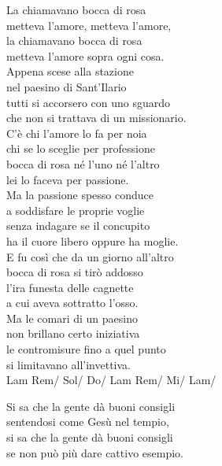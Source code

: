 \documentclass[10pt, twoside, a4paper]{article}
\begin{document}
\begin{multicols}{2}

La chiamavano bocca di rosa \\
metteva l'amore, metteva l'amore, \\
la chiamavano bocca di rosa \\
metteva l'amore sopra ogni cosa. \\

Appena scese alla stazione \\
nel paesino di Sant'Ilario \\
tutti si accorsero con uno sguardo \\
che non si trattava di un missionario. \\

C'\`e chi l'amore lo fa per noia \\
chi se lo sceglie per professione \\
bocca di rosa n\'e l'uno n\'e l'altro \\
lei lo faceva per passione. \\

Ma la passione spesso conduce \\
a soddisfare le proprie voglie \\
senza indagare se il concupito \\
ha il cuore libero oppure ha moglie. \\

E fu cos\`i che da un giorno all'altro \\
bocca di rosa si tir\`o addosso \\
l'ira funesta delle cagnette \\
a cui aveva sottratto l'osso. \\

Ma le comari di un paesino \\
non brillano certo iniziativa \\
le contromisure fino a quel punto \\
si limitavano all'invettiva. \\

Lam Rem/ Sol/ Do/ Lam Rem/ Mi/ Lam/
\columnbreak

Si sa che la gente d\`a buoni consigli \\
sentendosi come Ges\`u nel tempio, \\
si sa che la gente d\`a buoni consigli \\
se non pu\`o pi\`u dare cattivo esempio. \\


\end{multicols}
\end{document}
